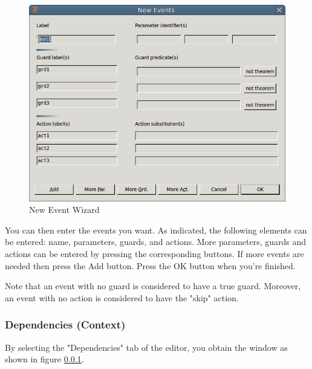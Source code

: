 \begin{figure}[!h]
\begin{center}
	\includegraphics{img/reference/ref_01_eventb_editor16.png}
	\caption{New Event Wizard}
	\label{fig_ref_01_eventb_editor16}
\end{center}
\end{figure}

You can then enter the events you want. As indicated, the following elements can be entered: name, parameters, guards, and actions. More parameters, guards and actions can be entered by pressing the corresponding buttons. If more events are needed then press the \textsf{Add} button. Press the \textsf{OK} button when you’re finished.

Note that an event with no guard is considered to have a true guard. Moreover, an event with no action is considered to have the "skip" action. 

\subsubsection{Dependencies (Context)}

By selecting the "Dependencies" tab of the editor, you obtain the window as shown in figure \ref{}.

